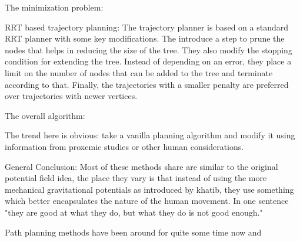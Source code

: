 The minimization problem:

RRT based trajectory planning:
The trajectory planner is based on a standard RRT planner with some key modifications. The introduce a step to prune the nodes that helps in reducing the size of the tree. They also modify the stopping condition for extending the tree. Instead of depending on an error, they place a limit on the number of nodes that can be added to the tree and terminate according to that. Finally, the trajectories with a smaller penalty are preferred over trajectories with newer vertices.

The overall algorithm:

The trend here is obvious: take a vanilla planning algorithm and modify it using information from proxemic studies or other human considerations.

General Conclusion:
Most of these methods share are similar to the original potential field idea, the place they vary is that instead of using the more mechanical gravitational potentials as introduced by khatib, they use something which better encapsulates the nature of the human movement.
In one sentence "they are good at what they do, but what they do is not good enough."

Path planning methods have been around for quite some time now and 


